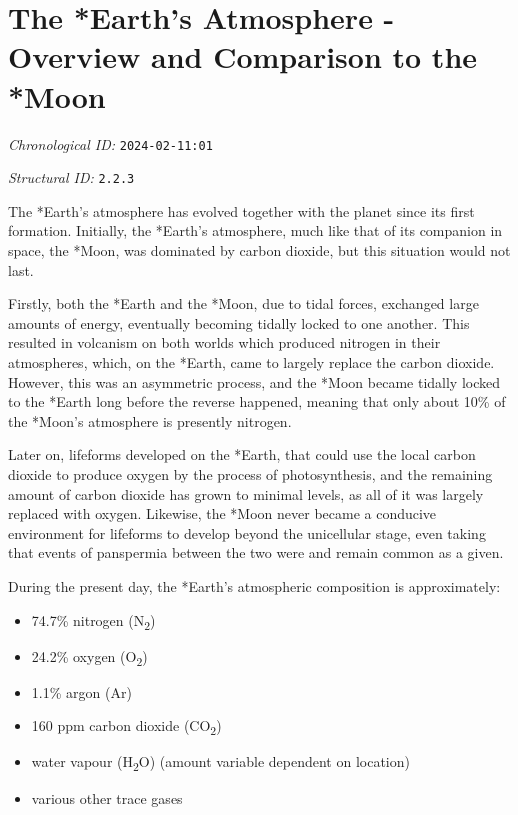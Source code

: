 \section{The *Earth's Atmosphere - Overview and Comparison to the *Moon}
\emph{Chronological ID:} \texttt{2024-02-11:01}

\emph{Structural ID:} \texttt{2.2.3}

The *Earth's atmosphere has evolved together with the planet since its first formation. Initially, the *Earth's atmosphere, much like that of its companion in space, the *Moon, was dominated by carbon dioxide, but this situation would not last.

Firstly, both the *Earth and the *Moon, due to tidal forces, exchanged large amounts of energy, eventually becoming tidally locked to one another. This resulted in volcanism on both worlds which produced nitrogen in their atmospheres, which, on the *Earth, came to largely replace the carbon dioxide. However, this was an asymmetric process, and the *Moon became tidally locked to the *Earth long before the reverse happened, meaning that only about 10\% of the *Moon's atmosphere is presently nitrogen.

Later on, lifeforms developed on the *Earth, that could use the local carbon dioxide to produce oxygen by the process of photosynthesis, and the remaining amount of carbon dioxide has grown to minimal levels, as all of it was largely replaced with oxygen. Likewise, the *Moon never became a conducive environment for lifeforms to develop beyond the unicellular stage, even taking that events of panspermia between the two were and remain common as a given.

During the present day, the *Earth's atmospheric composition is approximately:

\begin{itemize}
  \item 74.7\% nitrogen (N\textsubscript{2})
  \item 24.2\% oxygen (O\textsubscript{2})
  \item 1.1\% argon (Ar)
  \item 160 ppm carbon dioxide (CO\textsubscript{2})
  \item water vapour (H\textsubscript{2}O) (amount variable dependent on location)
  \item various other trace gases
\end{itemize}
\newpage
